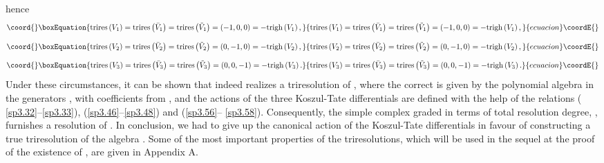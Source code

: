 \documentclass[a4paper,12pt]{article}
\begin{document}
hence 
\begin{equation}\coord{}\boxEquation{
\mathrm{trires}\left( V_{1}\right) =\mathrm{trires}\left( \bar{V}_{1}\right)
=\mathrm{trires}\left( \tilde{V}_{1}\right) =\left( -1,0,0\right) =-\mathrm{
trigh}\left( V_{1}\right) ,  \label{sp3.64a}
}{
\mathrm{trires}\left( V_{1}\right) =\mathrm{trires}\left( \bar{V}_{1}\right)
=\mathrm{trires}\left( \tilde{V}_{1}\right) =\left( -1,0,0\right) =-\mathrm{
trigh}\left( V_{1}\right) ,  }{ecuacion}\coordE{}\end{equation}
\begin{equation}\coord{}\boxEquation{
\mathrm{trires}\left( V_{2}\right) =\mathrm{trires}\left( \bar{V}_{2}\right)
=\mathrm{trires}\left( \tilde{V}_{2}\right) =\left( 0,-1,0\right) =-\mathrm{
trigh}\left( V_{2}\right) ,  \label{sp3.64b}
}{
\mathrm{trires}\left( V_{2}\right) =\mathrm{trires}\left( \bar{V}_{2}\right)
=\mathrm{trires}\left( \tilde{V}_{2}\right) =\left( 0,-1,0\right) =-\mathrm{
trigh}\left( V_{2}\right) ,  }{ecuacion}\coordE{}\end{equation}
\begin{equation}\coord{}\boxEquation{
\mathrm{trires}\left( V_{3}\right) =\mathrm{trires}\left( \bar{V}_{3}\right)
=\mathrm{trires}\left( \tilde{V}_{3}\right) =\left( 0,0,-1\right) =-\mathrm{
trigh}\left( V_{3}\right) .  \label{sp3.64c}
}{
\mathrm{trires}\left( V_{3}\right) =\mathrm{trires}\left( \bar{V}_{3}\right)
=\mathrm{trires}\left( \tilde{V}_{3}\right) =\left( 0,0,-1\right) =-\mathrm{
trigh}\left( V_{3}\right) .  }{ecuacion}\coordE{}\end{equation}
Under these circumstances, it can be shown that \coordHE{} indeed realizes a
triresolution of \coordHE{}, where the correct \coordHE{} is given by the polynomial algebra in the generators \coordHE{}, with
coefficients from \coordHE{}, and the actions of the
three Koszul-Tate differentials are defined with the help of the relations (%
\ref{sp3.32}--\ref{sp3.33}), (\ref{sp3.46}--\ref{sp3.48}) and (\ref{sp3.56}--%
\ref{sp3.58}). Consequently, the simple complex \coordHE{} graded in terms of total resolution degree, \coordHE{}, furnishes a resolution of \coordHE{}. In
conclusion, we had to give up the canonical action of the Koszul-Tate
differentials in favour of constructing a true triresolution of the algebra \coordHE{}. Some of the most important properties of
the triresolutions, which will be used in the sequel at the proof of the
existence of \coordHE{}, are given in Appendix A.
\end{document}
